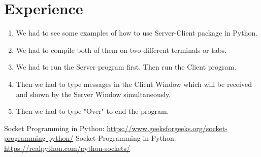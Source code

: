 \documentclass[11pt]{article}
\begin{document}
\newpage
\section{Experience}
\begin{enumerate}
    \item We had to see some examples of how to use Server-Client package in Python.
    \item We had to compile both of them on two different terminals or tabs.
    \item We had to run the Server program first. Then run the Client program.
    \item Then we had to type messages in the Client Window which will be received and shown by the Server Window simultaneously.
    \item Then we had to type "Over" to end the program.
\end{enumerate}




\begin{thebibliography}{1}
   Socket Programming in Python: \url{https://www.geeksforgeeks.org/socket-programming-python/}
   Socket Programming in Python: \url{https://realpython.com/python-sockets/}
\end{thebibliography}
\end{document}
